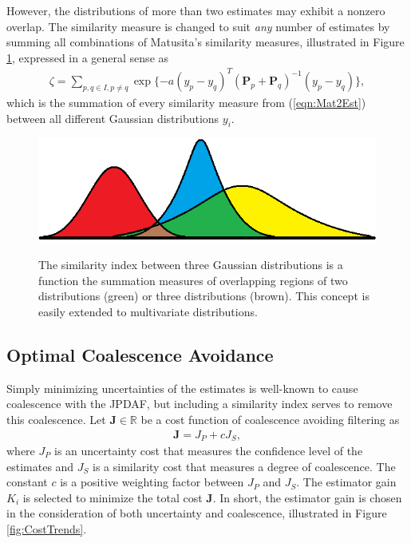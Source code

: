 \documentclass[letterpaper, 10pt, conference]{ieeeconf}
\newcommand{\refeqn}[1]{(\ref{eqn:#1})}
\renewcommand{\Re}{\ensuremath{\mathbb{R}}}
\begin{document}
However, the distributions of more than two estimates may exhibit a nonzero overlap.
The similarity measure is changed to suit \emph{any} number of estimates by summing all combinations of Matusita's similarity measures, illustrated in Figure \ref{fig:SimMeas}, expressed in a general sense as
\begin{align}
\zeta=\sum\limits_{p,q\in I,p\neq q}\exp \{-a(y_{p}- y_{q})^T({\mathbf P}_{p}
+{\mathbf P}_{q})^{-1}(y_{p}-y_{q})\},
\end{align}
which is the summation of every similarity measure from \refeqn{Mat2Est} between all different Gaussian distributions $y_i$.
\begin{figure}
\centerline{
		{\includegraphics[width=\columnwidth]{GaussianDistOverlap1D.png}}
	}
\caption{The similarity index between three Gaussian distributions is a function the summation measures of overlapping regions of two distributions (green) or three distributions (brown). This concept is easily extended to multivariate distributions.
}\label{fig:SimMeas}
\end{figure}

	
\subsection{Optimal Coalescence Avoidance}


Simply minimizing uncertainties of the estimates is well-known to cause coalescence with the JPDAF, but including a similarity index serves to remove this coalescence.
Let $\mathbf{J}\in\Re$ be a cost function of coalescence avoiding filtering as
\begin{align}
\mathbf{J}=J_P+cJ_S,
\end{align}
where $J_P$ is an uncertainty cost that measures the confidence level of the estimates and $J_S$ is a similarity cost that measures a degree of coalescence. The constant $c$ is a positive weighting factor between $J_P$ and $J_S$. 
The estimator gain $K_i$ is selected to minimize the total cost $\mathbf{J}$.
In short, the estimator gain is chosen in the consideration of both uncertainty and coalescence, illustrated in Figure \ref{fig:CostTrends}.
\end{document}
